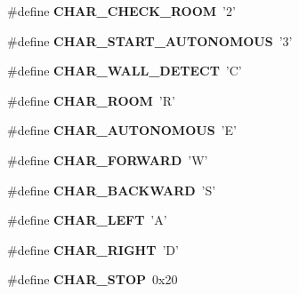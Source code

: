 \begin{DoxyCompactItemize}
\item 
\hypertarget{robotcode_8ino_a122a1d4695ae651ca004d41e1d00b6e4}{\#define {\bfseries C\+H\+A\+R\+\_\+\+C\+H\+E\+C\+K\+\_\+\+R\+O\+O\+M}~'2'}\label{robotcode_8ino_a122a1d4695ae651ca004d41e1d00b6e4}

\item 
\hypertarget{robotcode_8ino_a69a016ef92ad9ddb73560a123445502b}{\#define {\bfseries C\+H\+A\+R\+\_\+\+S\+T\+A\+R\+T\+\_\+\+A\+U\+T\+O\+N\+O\+M\+O\+U\+S}~'3'}\label{robotcode_8ino_a69a016ef92ad9ddb73560a123445502b}

\item 
\hypertarget{robotcode_8ino_a14691deb9ba5dc93a2bb3e0e8b4fdfd5}{\#define {\bfseries C\+H\+A\+R\+\_\+\+W\+A\+L\+L\+\_\+\+D\+E\+T\+E\+C\+T}~'C'}\label{robotcode_8ino_a14691deb9ba5dc93a2bb3e0e8b4fdfd5}

\item 
\hypertarget{robotcode_8ino_a663fe77d23ffb3b8c37f51583faf7c17}{\#define {\bfseries C\+H\+A\+R\+\_\+\+R\+O\+O\+M}~'R'}\label{robotcode_8ino_a663fe77d23ffb3b8c37f51583faf7c17}

\item 
\hypertarget{robotcode_8ino_a9a58b4c3522a04c4a0a65f9ad99f6a00}{\#define {\bfseries C\+H\+A\+R\+\_\+\+A\+U\+T\+O\+N\+O\+M\+O\+U\+S}~'E'}\label{robotcode_8ino_a9a58b4c3522a04c4a0a65f9ad99f6a00}

\item 
\hypertarget{robotcode_8ino_a764dbd349d8621accd792ee5210a3f74}{\#define {\bfseries C\+H\+A\+R\+\_\+\+F\+O\+R\+W\+A\+R\+D}~'W'}\label{robotcode_8ino_a764dbd349d8621accd792ee5210a3f74}

\item 
\hypertarget{robotcode_8ino_a1681b01a2698687a9b6aedd45b796f40}{\#define {\bfseries C\+H\+A\+R\+\_\+\+B\+A\+C\+K\+W\+A\+R\+D}~'S'}\label{robotcode_8ino_a1681b01a2698687a9b6aedd45b796f40}

\item 
\hypertarget{robotcode_8ino_aa05ecc497d01a93be5dd62ddaee54a75}{\#define {\bfseries C\+H\+A\+R\+\_\+\+L\+E\+F\+T}~'A'}\label{robotcode_8ino_aa05ecc497d01a93be5dd62ddaee54a75}

\item 
\hypertarget{robotcode_8ino_a94f7d75840f1acbd2c2acd01fc115d88}{\#define {\bfseries C\+H\+A\+R\+\_\+\+R\+I\+G\+H\+T}~'D'}\label{robotcode_8ino_a94f7d75840f1acbd2c2acd01fc115d88}

\item 
\hypertarget{robotcode_8ino_a245db460299318b2a2b61c2f884c1d19}{\#define {\bfseries C\+H\+A\+R\+\_\+\+S\+T\+O\+P}~0x20}\label{robotcode_8ino_a245db460299318b2a2b61c2f884c1d19}

\end{DoxyCompactItemize}

